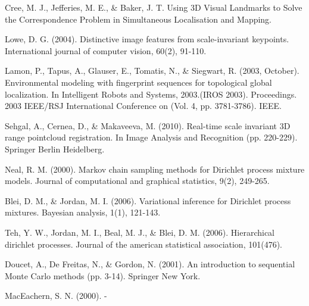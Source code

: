 \documentclass[twoside,hidelinks]{article}
\begin{document}
\begin{thebibliography}{9}
\newblock Cree, M. J., Jefferies, M. E., \& Baker, J. T. Using 3D Visual Landmarks to Solve the Correspondence Problem in Simultaneous Localisation and Mapping.

\newblock Lowe, D. G. (2004). Distinctive image features from scale-invariant keypoints. International journal of computer vision, 60(2), 91-110.

\newblock Lamon, P., Tapus, A., Glauser, E., Tomatis, N., \& Siegwart, R. (2003, October). Environmental modeling with fingerprint sequences for topological global localization. In Intelligent Robots and Systems, 2003.(IROS 2003). Proceedings. 2003 IEEE/RSJ International Conference on (Vol. 4, pp. 3781-3786). IEEE.


\newblock Sehgal, A., Cernea, D., \& Makaveeva, M. (2010). Real-time scale invariant 3D range pointcloud registration. In Image Analysis and Recognition (pp. 220-229). Springer Berlin Heidelberg.

\newblock Neal, R. M. (2000). Markov chain sampling methods for Dirichlet process mixture models. Journal of computational and graphical statistics, 9(2), 249-265.

\newblock Blei, D. M., \& Jordan, M. I. (2006). Variational inference for Dirichlet process mixtures. Bayesian analysis, 1(1), 121-143.


\newblock Teh, Y. W., Jordan, M. I., Beal, M. J., \& Blei, D. M. (2006). Hierarchical dirichlet processes. Journal of the american statistical association, 101(476).

\newblock Doucet, A., De Freitas, N., \& Gordon, N. (2001). An introduction to sequential Monte Carlo methods (pp. 3-14). Springer New York.


\newblock MacEachern, S. N. (2000). -



\end{thebibliography}
\end{document}
